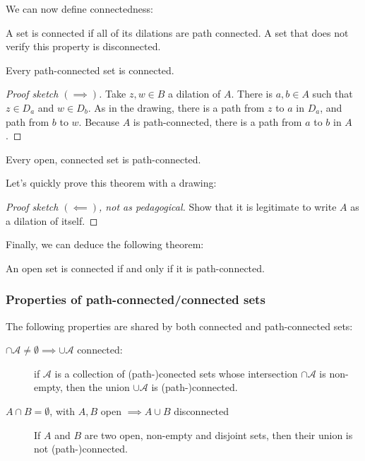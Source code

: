 We can now define connectedness:

\begin{defi}
    A set is connected if all of its dilations are path connected. A set that does not verify this property is disconnected.
\end{defi}

\begin{thm*}
    Every path-connected set is connected.
\end{thm*}

\begin{proof}[Proof sketch $(\implies)$]
    Take $z, w \in B$ a dilation of $A$. There is $a, b \in A$ such that $z\in D_a$ and $w\in D_b$.
    As in the drawing, there is a path from $z$ to $a$ in $D_a$, and path from $b$ to $w$. Because $A$ is path-connected, there is a path from $a$ to $b$ in $A$. 
\end{proof}

\begin{thm*}
    Every open, connected set is path-connected.
\end{thm*}

Let's quickly prove this theorem with a drawing:

\begin{proof}[Proof sketch $(\impliedby)$, not as pedagogical]
    Show that it is legitimate to write $A$ as a dilation of itself.
\end{proof}

Finally, we can deduce the following theorem:

\begin{thm*}
   An open set is connected if and only if it is path-connected. 
\end{thm*}

\subsubsection{Properties of path-connected/connected sets}

\begin{thm*}
    The following properties are shared by both connected and path-connected sets:
    \begin{description}
        \item[$\cap \mathcal{A} \neq \emptyset \implies \cup \mathcal{A}$ connected: ] if $\mathcal{A}$ is a collection of (path-)conected sets whose intersection $\cap \mathcal{A}$ is non-empty, then the union $\cup \mathcal{A}$ is (path-)connected.
        \item[$A \cap B = \emptyset$, with $A,B$ open $ \implies A\cup B$ disconnected] If $A$ and $B$ are two open, non-empty and disjoint sets, then their union is not (path-)connected.
    \end{description}
\end{thm*}

